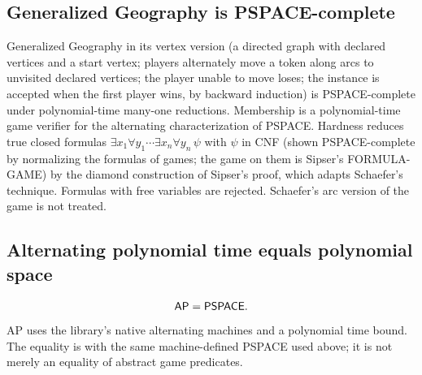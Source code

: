 \begin{result}
\subsection{Generalized Geography is PSPACE-complete}
Generalized Geography in its vertex version (a directed graph with declared vertices and a start
vertex; players alternately move a token along arcs to unvisited declared vertices; the player
unable to move loses; the instance is accepted when the first player wins, by backward induction)
is PSPACE-complete under polynomial-time many-one reductions. Membership is a polynomial-time game
verifier for the alternating characterization of PSPACE. Hardness reduces true closed formulas
$\exists x_1\forall y_1\cdots\exists x_n\forall y_n\,\psi$ with $\psi$ in CNF (shown PSPACE-complete by
normalizing the formulas of games; the game on them is Sipser's FORMULA-GAME) by the diamond
construction of Sipser's proof, which adapts Schaefer's technique. Formulas with free variables are
rejected. Schaefer's arc version of the game is not treated.\citep[Theorems 8.11, 8.14]{Sipser2013}\citep{LichtensteinSipser1980,Schaefer1978}
\end{result}


\begin{result}
\subsection{Alternating polynomial time equals polynomial space}
\[
\mathsf{AP}=\mathsf{PSPACE}.
\]
AP uses the library's native alternating machines and a polynomial time bound.
The equality is with the same machine-defined PSPACE used above; it is not merely
an equality of abstract game predicates.\citep{ChandraKozenStockmeyer1981}
\end{result}

